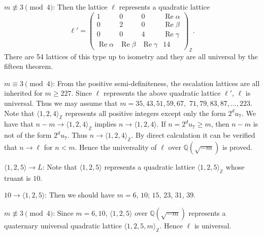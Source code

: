 \documentclass[a4paper,10pt,reqno]{amsart}
\begin{document}
{} $m {\not\equiv} 3 \pmod 4$: Then the lattice $\ell$ represents a quadratic lattice
\[
    \ell' = \begin{pmatrix}
        1 & 0 & 0 & {\operatorname{Re}}{\alpha} \\
        0 & 2 & 0 & {\operatorname{Re}}{\beta} \\
        0 & 0 & 4 & {\operatorname{Re}}{\gamma} \\
        {\operatorname{Re}}{\alpha} & {\operatorname{Re}}{\beta} & {\operatorname{Re}}{\gamma} & 14
    \end{pmatrix}_{\mathbb{Z}}.
\]
There are 54 lattices of this type up to isometry and they are all universal by the fifteen
theorem.

{} $m \equiv 3 \pmod{4}$: From the positive semi-definiteness, the escalation
lattices are all inherited for $m \ge 227$. Since $\ell$ represents the above quadratic lattice
$\ell'$, $\ell$ is universal. Thus we may assume that $m = 35, 43, 51, 59, 67,$ $71, 79, 83, 87,
\dotsc, 223$. Note that ${\langle {1,2,4} \rangle}_{\mathbb{Z}}$ represents all positive integers except only the form
$2^{d} u_7$. We have that $n-m \to {\langle {1,2,4} \rangle}_{\mathbb{Z}}$ implies $n \to {\langle {1,2,4} \rangle}$. If $n=2^{d} u_7 \ge
m$, then $n-m$ is not of the form $2^{d} u_7$. Thus $n \to {\langle {1,2,4} \rangle}_{\mathbb{Z}}$. By direct calculation it
can be verified that $n \to \ell$ for $n < m$. Hence the universality of $\ell$ over ${\mathbb{Q}(\sqrt{{-m}})}$ is
proved.

{} ${\langle {1,2,5} \rangle} \to L$:  Note that ${\langle {1,2,5} \rangle}$ represents a quadratic lattice
${\langle {1,2,5} \rangle}_{\mathbb{Z}}$ whose truant is $10$.

{} $10 \to {\langle {1,2,5} \rangle}$: Then we should have $m=6$, $10$; $15$, $23$, $31$, $39$.

{} $m {\not\equiv} 3 \pmod{4}$: Since $m = 6, 10$, ${\langle {1,2,5} \rangle}$ over ${\mathbb{Q}(\sqrt{{-m}})}$ represents
a quaternary universal quadratic lattice ${\langle {1,2,5,m} \rangle}_{\mathbb{Z}}$. Hence $\ell$ is universal.
\end{document}
